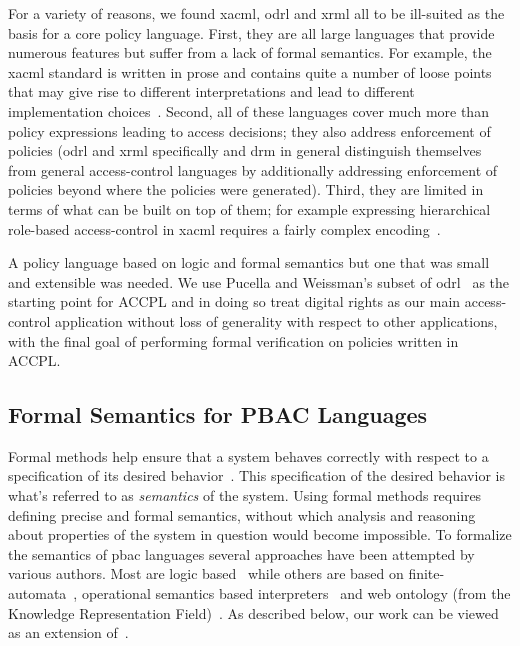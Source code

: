 \documentclass[conference]{IEEEtran}
\begin{document}
For a variety of reasons, we found \ac{xacml}, \ac{odrl} and \ac{xrml}
all to be ill-suited as the basis for a core policy language.  First,
they are all large languages that provide numerous features but suffer
from a lack of formal semantics. For example, the \ac{xacml} standard
is written in prose and contains quite a number of loose points that
may give rise to different interpretations and lead to different
implementation choices~\cite{DBLP:conf/essos/MasiPT12}.  Second, all
of these languages cover much more than policy expressions leading to
access decisions; they also address enforcement of policies (\ac{odrl}
and \ac{xrml} specifically and \ac{drm} in general distinguish
themselves from general access-control languages by additionally
addressing enforcement of policies beyond where the policies were
generated). Third, they are limited in terms of what can be built on
top of them; for example expressing hierarchical role-based
access-control in \ac{xacml} requires a fairly complex
encoding~\cite{Tschantz}.


A policy language based on logic and formal semantics but one that was small and extensible was needed. We use Pucella and Weissman's subset of \ac{odrl}~\cite{pucella2006} as the starting point for \ac{ACCPL} and in doing so treat digital rights as our main access-control application without loss of generality with respect to other applications, with the final goal of performing formal verification on policies written in \ac{ACCPL}.


\subsection{Formal Semantics for PBAC Languages}


Formal methods help ensure that a system behaves correctly with respect to a specification of its desired behavior~\cite{TAPL}. This specification of the desired behavior is what's referred to as \emph{semantics} of the system. Using formal methods requires defining precise and formal semantics, without which analysis and reasoning about properties of the system in question would become impossible. To formalize the semantics of \ac{pbac} languages several approaches have been attempted by various authors. Most are logic based~\cite{Halpern2008,pucella2006} while others are based on finite-automata~\cite{Holzer}, operational semantics based interpreters~\cite{Safavi-naini} and web ontology (from the Knowledge Representation Field)~\cite{Kasten2010MTS}. 
%
As described below, our work can be viewed as an extension
of~\cite{pucella2006}.
\end{document}

